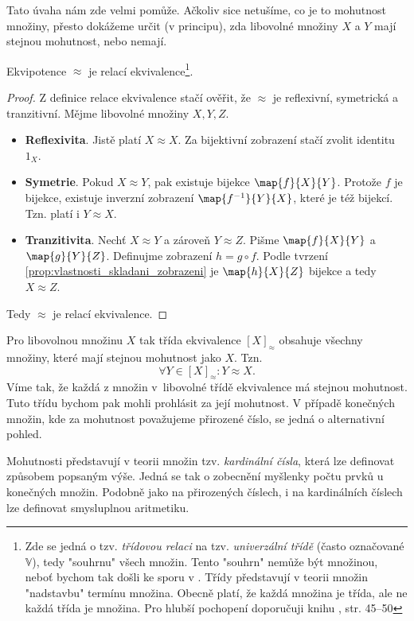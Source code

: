 Tato úvaha nám zde velmi pomůže. Ačkoliv sice netušíme, co je to mohutnost množiny, přesto dokážeme určit (v principu), zda libovolné množiny $X$ a $Y$ mají stejnou mohutnost, nebo nemají.
\begin{lemma}
    Ekvipotence $\approx$ je relací ekvivalence\footnote{Zde se jedná o tzv. \emph{třídovou relaci} na tzv. \emph{univerzální třídě} (často označované $\mathbb{V}$), tedy "souhrnu" všech množin. Tento "souhrn" nemůže být množinou, neboť bychom tak došli ke sporu v \ZF{}. Třídy představují v teorii množin "nadstavbu" termínu množina. Obecně platí, že každá množina je třída, ale ne každá třída je množina. Pro hlubší pochopení doporučuji knihu \cite{BalcarStepanek1986}, str. 45--50}.
\end{lemma}
\begin{proof}
    Z definice relace ekvivalence stačí ověřit, že $\approx$ je reflexivní, symetrická a tranzitivní. Mějme libovolné množiny $X,Y,Z$.
    \begin{itemize}
        \item \textbf{Reflexivita}. Jistě platí $X\approx X$. Za bijektivní zobrazení stačí zvolit identitu $1_X$.
        \item \textbf{Symetrie}. Pokud $X\approx Y$, pak existuje bijekce $\map{f}{X}{Y}$. Protože $f$ je bijekce, existuje inverzní zobrazení $\map{f^{-1}}{Y}{X}$, které je též bijekcí. Tzn. platí i $Y\approx X$.
        \item \textbf{Tranzitivita}. Nechť $X\approx Y$ a zároveň $Y\approx Z$. Pišme $\map{f}{X}{Y}$ a $\map{g}{Y}{Z}$. Definujme zobrazení $h=g\circ f$. Podle tvrzení \ref{prop:vlastnosti_skladani_zobrazeni} je $\map{h}{X}{Z}$ bijekce a tedy $X\approx Z$.
    \end{itemize}
    Tedy $\approx$ je relací ekvivalence.
\end{proof}
Pro libovolnou množinu $X$ tak třída ekvivalence $[X]_\approx$ obsahuje všechny množiny, které mají stejnou mohutnost jako $X$. Tzn.
\begin{equation*}
    \forall Y\in [X]_\approx: Y\approx X.
\end{equation*}
Víme tak, že každá z množin v~libovolné třídě ekvivalence má stejnou mohutnost. Tuto třídu bychom pak mohli prohlásit za její mohutnost. V případě konečných množin, kde za mohutnost považujeme přirozené číslo, se jedná o alternativní pohled.\par
Mohutnosti představují v teorii množin tzv. \emph{kardinální čísla}, která lze definovat způsobem popsaným výše. Jedná se tak o zobecnění myšlenky počtu prvků u konečných množin. Podobně jako na přirozených číslech, i na kardinálních číslech lze definovat smysluplnou aritmetiku.